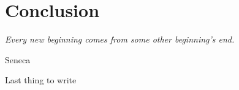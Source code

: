 \chapter*{Conclusion}
\epigraph{\emph{Every new beginning comes from some other beginning's end.}} {Seneca}

Last thing to write

